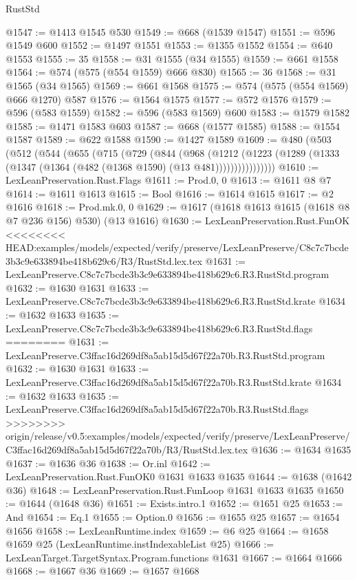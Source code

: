 \begin{lexlean}{RustStd}
\begin{coremodule}
{\begin{coremodule}
{{{{{{{{{{{{{{{{@1547 := @1413 @1545 @530
@1549 := @668 (@1539 @1547)
@1551 := @596 @1549 @600
@1552 := @1497 @1551
@1553 := @1355 @1552
@1554 := @640 @1553
@1555 := 35
@1558 := @31 @1555 (@34 @1555)
@1559 := @661 @1558
@1564 := @574 (@575 (@554 @1559) @666 @830)
@1565 := 36
@1568 := @31 @1565 (@34 @1565)
@1569 := @661 @1568
@1575 := @574 (@575 (@554 @1569) @666 @1270) @587
@1576 := @1564 @1575
@1577 := @572 @1576
@1579 := @596 (@583 @1559)
@1582 := @596 (@583 @1569) @600
@1583 := @1579 @1582
@1585 := @1471 @1583 @603
@1587 := @668 (@1577 @1585)
@1588 := @1554 @1587
@1589 := @622 @1588
@1590 := @1427 @1589
@1609 := @480
    (@503
      (@512
        (@544
          (@655
            (@715
              (@729
                (@844
                  (@968
                    (@1212
                      (@1223
                        (@1289 (@1333 (@1347 (@1364 (@482 (@1368 @1590) (@13 @481))))))))))))))))
@1610 := LexLeanPreservation.Rust.Flags
@1611 := Prod.{0, 0}
@1613 := @1611 @8 @7
@1614 := @1611 @1613
@1615 := Bool
@1616 := @1614 @1615
@1617 := @2 @1616
@1618 := Prod.mk.{0, 0}
@1629 := @1617 (@1618 @1613 @1615 (@1618 @8 @7 @236 @156) @530) (@13 @1616)
@1630 := LexLeanPreservation.Rust.FunOK
<<<<<<<< HEAD:examples/models/expected/verify/preserve/LexLeanPreserve/C8c7c7bcde3b3c9e633894be418b629c6/R3/RustStd.lex.tex
@1631 := LexLeanPreserve.C8c7c7bcde3b3c9e633894be418b629c6.R3.RustStd.program
@1632 := @1630 @1631
@1633 := LexLeanPreserve.C8c7c7bcde3b3c9e633894be418b629c6.R3.RustStd.krate
@1634 := @1632 @1633
@1635 := LexLeanPreserve.C8c7c7bcde3b3c9e633894be418b629c6.R3.RustStd.flags
========
@1631 := LexLeanPreserve.C3ffac16d269df8a5ab15d5d67f22a70b.R3.RustStd.program
@1632 := @1630 @1631
@1633 := LexLeanPreserve.C3ffac16d269df8a5ab15d5d67f22a70b.R3.RustStd.krate
@1634 := @1632 @1633
@1635 := LexLeanPreserve.C3ffac16d269df8a5ab15d5d67f22a70b.R3.RustStd.flags
>>>>>>>> origin/release/v0.5:examples/models/expected/verify/preserve/LexLeanPreserve/C3ffac16d269df8a5ab15d5d67f22a70b/R3/RustStd.lex.tex
@1636 := @1634 @1635
@1637 := @1636 @36
@1638 := Or.inl
@1642 := LexLeanPreservation.Rust.FunOK0 @1631 @1633 @1635
@1644 := @1638 (@1642 @36)
@1648 := LexLeanPreservation.Rust.FunLoop @1631 @1633 @1635
@1650 := @1644 (@1648 @36)
@1651 := Exists.intro.{1}
@1652 := @1651 @25
@1653 := And
@1654 := Eq.{1}
@1655 := Option.{0}
@1656 := @1655 @25
@1657 := @1654 @1656
@1658 := LexLeanRuntime.index
@1659 := @6 @25
@1664 := @1658 @1659 @25 (LexLeanRuntime.instIndexableList @25)
@1666 := LexLeanTarget.TargetSyntax.Program.functions @1631
@1667 := @1664 @1666
@1668 := @1667 @36
@1669 := @1657 @1668
}}}}}}}}}}}}}}}}
\end{coremodule}}
\end{coremodule}
\end{lexlean}
